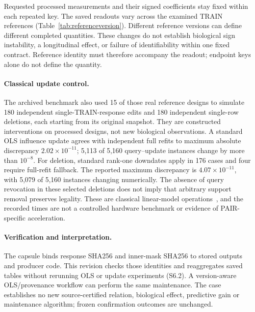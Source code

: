 \documentclass[11pt]{article}
\begin{document}
Requested processed measurements and their signed coefficients stay fixed within each repeated key. The saved readouts vary across the examined TRAIN references (Table~\ref{tab:referenceversion}). Different reference versions can define different completed quantities. These changes do not establish biological sign instability, a longitudinal effect, or failure of identifiability within one fixed contract. Reference identity must therefore accompany the readout; endpoint keys alone do not define the quantity.

\paragraph{Classical update control.}
The archived benchmark also used 15 of those real reference designs to simulate 180 independent single-TRAIN-response edits and 180 independent single-row deletions, each starting from its original snapshot. They are constructed interventions on processed designs, not new biological observations. A standard OLS influence update agrees with independent full refits to maximum absolute discrepancy $2.02\times10^{-11}$; 5,113 of 5,160 query--update instances change by more than $10^{-8}$. For deletion, standard rank-one downdates apply in 176 cases and four require full-refit fallback. The reported maximum discrepancy is $4.07\times10^{-11}$, with 5,079 of 5,160 instances changing numerically. The absence of query revocation in these selected deletions does not imply that arbitrary support removal preserves legality. These are classical linear-model operations~\cite{rao1971generalized}, and the recorded times are not a controlled hardware benchmark or evidence of PAIR-specific acceleration.

\paragraph{Verification and interpretation.}
The capsule binds response SHA256 \texttt{} and inner-mask SHA256 \texttt{} to stored outputs and producer code. This revision checks those identities and reaggregates saved tables without rerunning OLS or update experiments (S6.2). A version-aware OLS/provenance workflow can perform the same maintenance. The case establishes no new source-certified relation, biological effect, predictive gain or maintenance algorithm; frozen confirmation outcomes are unchanged.
\end{document}
